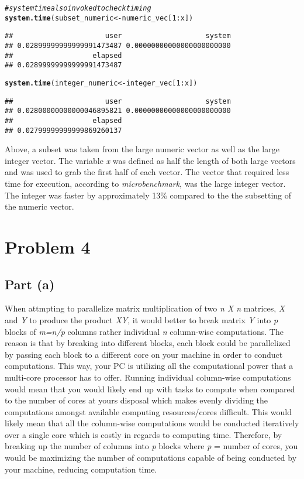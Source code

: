 \documentclass{article}\usepackage[]{graphicx}\usepackage[]{color}
\makeatletter
\newcommand{\hlnum}[1]{\textcolor[rgb]{0.686,0.059,0.569}{#1}}%
\newcommand{\hlcom}[1]{\textcolor[rgb]{0.678,0.584,0.686}{\textit{#1}}}%
\newcommand{\hlopt}[1]{\textcolor[rgb]{0,0,0}{#1}}%
\newcommand{\hlstd}[1]{\textcolor[rgb]{0.345,0.345,0.345}{#1}}%
\newcommand{\hlkwb}[1]{\textcolor[rgb]{0.69,0.353,0.396}{#1}}%
\newcommand{\hlkwd}[1]{\textcolor[rgb]{0.737,0.353,0.396}{\textbf{#1}}}%
\newenvironment{kframe}{%
 \def\at@end@of@kframe{}%
 \ifinner\ifhmode%
  \def\at@end@of@kframe{\end{minipage}}%
  \begin{minipage}{\columnwidth}%
 \fi\fi%
 \def\FrameCommand##1{\hskip\@totalleftmargin \hskip-\fboxsep
 \colorbox{shadecolor}{##1}\hskip-\fboxsep
     \hskip-\linewidth \hskip-\@totalleftmargin \hskip\columnwidth}%
 \MakeFramed {\advance\hsize-\width
   \@totalleftmargin\z@ \linewidth\hsize
   \@setminipage}}%
 {\par\unskip\endMakeFramed%
 \at@end@of@kframe}
\newenvironment{knitrout}{}{} %
\makeatother
\begin{document}
\begin{knitrout}
\begin{kframe}
\begin{alltt}
\hlcom{#system time also invoked to check timing}
\hlkwd{system.time}\hlstd{(subset_numeric} \hlkwb{<-} \hlstd{numeric_vec[}\hlnum{1}\hlopt{:}\hlstd{x])}
\end{alltt}
\begin{verbatim}
##                      user                    system 
## 0.02899999999999991473487 0.00000000000000000000000 
##                   elapsed 
## 0.02899999999999991473487
\end{verbatim}
\begin{alltt}
\hlkwd{system.time}\hlstd{(integer_numeric} \hlkwb{<-} \hlstd{integer_vec[}\hlnum{1}\hlopt{:}\hlstd{x])}
\end{alltt}
\begin{verbatim}
##                      user                    system 
## 0.02800000000000046895821 0.00000000000000000000000 
##                   elapsed 
## 0.02799999999999869260137
\end{verbatim}
\end{kframe}
\end{knitrout}
Above, a subset was taken from the large numeric vector as well as the large integer vector.  The variable \emph{x} was defined as half the length of both large vectors and was used to grab the first half of each vector.  The vector that required less time for execution, according to \emph{microbenchmark}, was the large integer vector.  The integer was faster by approximately 13\% compared to the the subsetting of the numeric vector.
\section{Problem 4}
\subsection{Part (a)}
When attmpting to  parallelize matrix multiplication of two \emph{n X n} matrices, \emph{X} and \emph{Y} to produce the product \emph{XY}, it would better to break matrix \emph{Y} into \emph{p} blocks of \emph{m=n/p} columns rather individual \emph{n} column-wise computations.  The reason is that by breaking into different blocks, each block could be parallelized by passing each block to a different core on your machine in order to conduct computations.  This way, your PC is utilizing all the computational power that a multi-core processor has to offer.  Running individual column-wise computations would mean that you would likely end up with tasks to compute when compared to the number of cores at yours disposal which makes evenly dividing the computations amongst available computing resources/cores difficult.  This would likely mean that all the column-wise computations would be conducted iteratively over a single core which is costly in regards to computing time.  Therefore, by breaking up the number of columns into \emph{p} blocks where \emph{p} = number of cores, you would be maximizing the number of computations capable of being conducted by your machine, reducing computation time. 
\end{document}
